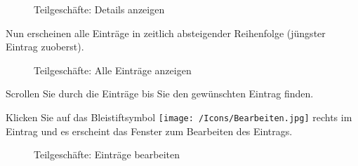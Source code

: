 \begin{figure}[H]
\caption{Teilgeschäfte: Details anzeigen}
\end{figure}

Nun erscheinen alle Einträge in zeitlich absteigender Reihenfolge (jüngster Eintrag zuoberst).

\begin{figure}[H]
\caption{Teilgeschäfte: Alle Einträge anzeigen}
\end{figure}

Scrollen Sie durch die Einträge bis Sie den gewünschten Eintrag finden.

\vspace{\baselineskip}

Klicken Sie auf das Bleistiftsymbol \texttt{[image: /Icons/Bearbeiten.jpg]}  rechts im Eintrag und es erscheint das Fenster zum Bearbeiten des Eintrags.

\begin{figure}[H]
\caption{Teilgeschäfte: Einträge bearbeiten}
\end{figure}

